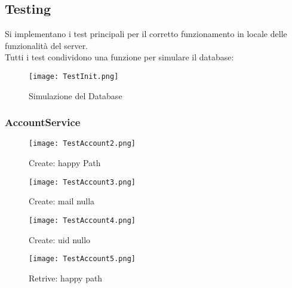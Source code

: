 \subsection{Testing}
Si implementano i test principali per il corretto funzionamento in locale delle funzionalità del server.\\
Tutti i test condividono una funzione per simulare il database:
\begin{figure}[h!]
    \begin{center}
        \texttt{[image: TestInit.png]}
        \caption{Simulazione del Database}
    \end{center}
\end{figure}
\subsubsection{AccountService}
\begin{figure}[h!]
    \begin{center}
        \texttt{[image: TestAccount2.png]}
        \caption{Create: happy Path}
    \end{center}
\end{figure}
\begin{figure}[h!]
    \begin{center}
        \texttt{[image: TestAccount3.png]}
        \caption{Create: mail nulla}
    \end{center}
\end{figure}
\begin{figure}[h!]
    \begin{center}
        \texttt{[image: TestAccount4.png]}
        \caption{Create: uid nullo}
    \end{center}
\end{figure}
\begin{figure}[h!]
    \begin{center}
        \texttt{[image: TestAccount5.png]}
        \caption{Retrive: happy path}
    \end{center}
\end{figure}
\clearpage

